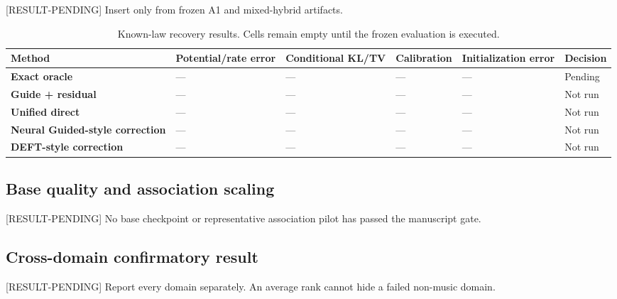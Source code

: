 \documentclass[11pt]{article}
\newcommand{\status}[1]{%
  \textcolor{statusred}{\textbf{\texttt{[#1]}}}%
}
\def\status#1{[#1]}%
\begin{document}
\status{RESULT-PENDING} Insert only from frozen A1 and mixed-hybrid artifacts.

\begin{landscape}
\begin{table}[p]
\centering
\scriptsize
\renewcommand{\arraystretch}{1.18}
\setlength{\tabcolsep}{3.5pt}
\caption{Known-law recovery results. Cells remain empty until the frozen evaluation is executed.}\label{tab:known-law-results}
\begin{tabularx}{\linewidth}{@{}*{6}{Y}@{}}
\toprule
\textbf{Method} & \textbf{Potential/\allowbreak{}rate error} & \textbf{Conditional KL/\allowbreak{}TV} & \textbf{Calibration} & \textbf{Initialization error} & \textbf{Decision} \\
\midrule
\textbf{Exact oracle} & --- & --- & --- & --- & Pending \\
\textbf{Guide + residual} & --- & --- & --- & --- & Not run \\
\textbf{Unified direct} & --- & --- & --- & --- & Not run \\
\textbf{Neural Guided-style correction} & --- & --- & --- & --- & Not run \\
\textbf{DEFT-style correction} & --- & --- & --- & --- & Not run \\
\bottomrule
\end{tabularx}
\end{table}
\end{landscape}

\subsection{Base quality and association scaling}
\label{sec:base-quality-and-association-scaling}

\status{RESULT-PENDING} No base checkpoint or representative association pilot has passed the manuscript gate.

\subsection{Cross-domain confirmatory result}
\label{sec:cross-domain-confirmatory-result}

\status{RESULT-PENDING} Report every domain separately. An average rank cannot hide a failed non-music domain.
\end{document}
